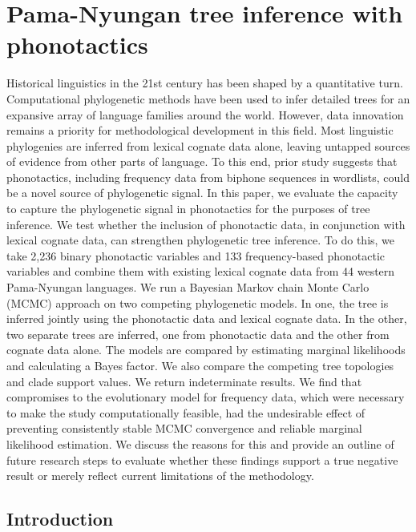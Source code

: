 \chapter[Pama-Nyungan tree inference with phonotactics]{Pama-Nyungan tree inference with phonotactics}
\label{ch-tree-inference}	%
\pagestyle{headings}


Historical linguistics in the 21st century has been shaped by a quantitative turn. Computational phylogenetic methods have been used to infer detailed trees for an expansive array of language families around the world. However, data innovation remains a priority for methodological development in this field. Most linguistic phylogenies are inferred from lexical cognate data alone, leaving untapped sources of evidence from other parts of language. To this end, prior study suggests that phonotactics, including frequency data from biphone sequences in wordlists, could be a novel source of phylogenetic signal. In this paper, we evaluate the capacity to capture the phylogenetic signal in phonotactics for the purposes of tree inference. We test whether the inclusion of phonotactic data, in conjunction with lexical cognate data, can strengthen phylogenetic tree inference. To do this, we take 2,236 binary phonotactic variables and 133 frequency-based phonotactic variables and combine them with existing lexical cognate data from 44 western Pama-Nyungan languages. We run a Bayesian Markov chain Monte Carlo (MCMC) approach on two competing phylogenetic models. In one, the tree is inferred jointly using the phonotactic data and lexical cognate data. In the other, two separate trees are inferred, one from phonotactic data and the other from cognate data alone. The models are compared by estimating marginal likelihoods and calculating a Bayes factor. We also compare the competing tree topologies and clade support values. We return indeterminate results. We find that compromises to the evolutionary model for frequency data, which were necessary to make the study computationally feasible, had the undesirable effect of preventing consistently stable MCMC convergence and reliable marginal likelihood estimation. We discuss the reasons for this and provide an outline of future research steps to evaluate whether these findings support a true negative result or merely reflect current limitations of the methodology.

\hypertarget{pn-tree-intro}{%
\section{Introduction}\label{pn-tree-intro}}

